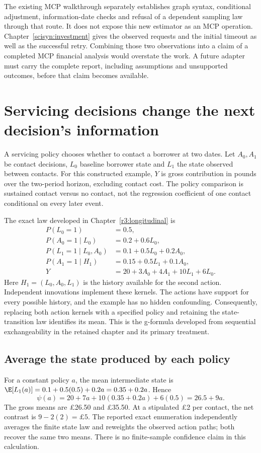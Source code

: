 The existing MCP walkthrough separately establishes graph syntax, conditional
adjustment, information-date checks and refusal of a dependent sampling law
through that route. It does not expose this new estimator as an MCP operation.
Chapter~\ref{scisyn:investment} gives the observed requests and the initial
timeout as well as the successful retry. Combining those two observations
into a claim of a completed MCP financial analysis would overstate the work.
A future adapter must carry the complete report, including assumptions and
unsupported outcomes, before that claim becomes available.

\chapter{Servicing decisions change the next decision's information}
\label{rewrite:servicing}

A servicing policy chooses whether to contact a borrower at two dates. Let
$A_0,A_1$ be contact decisions, $L_0$ baseline borrower state and $L_1$ the
state observed between contacts. For this constructed example, $Y$ is
gross contribution in pounds over the two-period horizon, excluding contact
cost. The policy comparison is sustained contact versus no contact, not
the regression coefficient of one contact conditional on every later event.

The exact law developed in Chapter~\ref{r3:longitudinal} is
\begin{align*}
 P(L_0=1)&=0.5,\\
 P(A_0=1\mid L_0)&=0.2+0.6L_0,\\
 P(L_1=1\mid L_0,A_0)&=0.1+0.5L_0+0.2A_0,\\
 P(A_1=1\mid H_1)&=0.15+0.5L_1+0.1A_0,\\
 Y&=20+3A_0+4A_1+10L_1+6L_0.
\end{align*}
Here $H_1=(L_0,A_0,L_1)$ is the history available for the second action.
Independent innovations implement these kernels. The actions have support
for every possible history, and the example has no hidden confounding.
Consequently, replacing both action kernels with a specified policy and
retaining the state-transition law identifies its mean. This is the
g-formula developed from sequential exchangeability in the retained chapter
and its primary treatment. \citep[Chapter 21]{hernan2020}

\section{Average the state produced by each policy}
For a constant policy $a$, the mean intermediate state is
$\E[L_1(a)]=0.1+0.5(0.5)+0.2a=0.35+0.2a$. Hence
\[
 \psi(a)=20+7a+10(0.35+0.2a)+6(0.5)=26.5+9a.
\]
The gross means are \pounds26.50 and \pounds35.50. At a stipulated
\pounds2 per contact, the net contrast is $9-2(2)=\pounds5$.
The reported exact enumeration independently averages the finite state law
and reweights the observed action paths; both recover the same two means.
There is no finite-sample confidence claim in this calculation.


